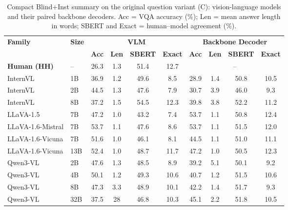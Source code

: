 \begin{table}[t]
\scriptsize
\centering
\setlength{\tabcolsep}{3pt}
\begin{tabular}{ll|cccc|cccc}
\toprule
\textbf{Family} & \textbf{Size} & \multicolumn{4}{c|}{\textbf{VLM}}& \multicolumn{4}{c}{\textbf{Backbone Decoder}} \\
\cmidrule(lr){3-6}\cmidrule(lr){7-10}
 & & \textbf{Acc} & \textbf{Len} & \textbf{SBERT} & \textbf{Exact}& \textbf{Acc} & \textbf{Len} & \textbf{SBERT} & \textbf{Exact} \\
\midrule
\textbf{Human (HH)} & -- & 26.3 & 1.3 & 51.4 & 12.7 & \multicolumn{4}{c}{--} \\
\midrule
InternVL & 1B & 36.9 & 1.2 & 49.6 & 8.5 & 28.9 & 1.4 & 50.8 & 10.5 \\
InternVL & 2B & 44.5 & 1.3 & 47.6 & 7.9 & 30.7 & 3.9 & 46.0 & 9.3 \\
InternVL & 8B & 37.2 & 1.5 & 54.5 & 12.3 & 39.8 & 3.8 & 52.2 & 11.2 \\
LLaVA-1.5 & 7B & 47.2 & 1.0 & 43.2 & 7.4 & 53.7 & 1.1 & 50.8 & 12.4 \\
LLaVA-1.6-Mistral & 7B & 53.7 & 1.1 & 47.6 & 8.6 & 53.7 & 1.1 & 51.5 & 12.0 \\
LLaVA-1.6-Vicuna & 7B & 51.6 & 1.0 & 46.1 & 8.1 & 44.5 & 1.1 & 51.0 & 11.1 \\
LLaVA-1.6-Vicuna & 13B & 52.4 & 1.0 & 48.7 & 11.7 & 47.2 & 1.0 & 50.5 & 12.3 \\
Qwen3-VL & 2B & 47.6 & 1.3 & 48.5 & 8.9 & 39.2 & 5.1 & 50.1 & 9.2 \\
Qwen3-VL & 4B & 50.1 & 1.2 & 49.3 & 10.6 & 40.7 & 1.2 & 51.5 & 10.6 \\
Qwen3-VL & 8B & 47.3 & 3.3 & 48.9 & 10.1 & 42.2 & 1.4 & 51.7 & 9.3 \\
Qwen3-VL & 32B & 37.5 & 28 & 46.8 & 10.3 & 45.1 & 2.2 & 51.8 & 10.5 \\
\bottomrule
\end{tabular}
\caption{\small Compact Blind+Inst summary on the original question variant (C): vision-language models and their paired backbone decoders. Acc = VQA accuracy (\%); Len = mean answer length in words; SBERT and Exact = human--model agreement (\%).}
\label{tab:summary_vlm_decoder_vc_side}
\end{table}
